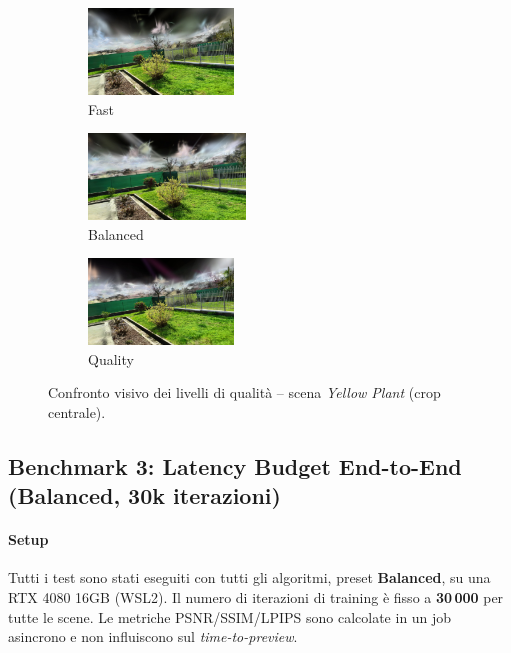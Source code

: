 \begin{figure}[H]
	\centering
	\begin{subfigure}{0.32\textwidth}
		\includegraphics[width=\linewidth, height=2.3cm, trim={80 40 80 40}, clip]{images/benchmarks/yellow_plant_taming_fast.jpg}
		\caption{Fast}
	\end{subfigure}
	\hfill
	\begin{subfigure}{0.32\textwidth}
		\includegraphics[width=\linewidth, height=2.3cm, trim={80 40 80 40}, clip]{images/benchmarks/yellow_plant_taming_balanced.jpg}
		\caption{Balanced}
	\end{subfigure}
	\hfill
	\begin{subfigure}{0.32\textwidth}
		\includegraphics[width=\linewidth, height=2.3cm, trim={80 40 80 40}, clip]{images/benchmarks/yellow_plant_taming_quality.jpg}
		\caption{Quality}
	\end{subfigure}
	\caption{Confronto visivo dei livelli di qualit\`a -- scena \textit{Yellow Plant} (crop centrale).}
	\label{fig:yellow_plant_quality_comparison}
\end{figure}


\subsection{Benchmark 3: Latency Budget End-to-End (Balanced, 30k iterazioni)}
\label{subsec:latency_budget_inria}

\paragraph{Setup}
Tutti i test sono stati eseguiti con tutti gli algoritmi, preset \textbf{Balanced}, su una RTX 4080 16GB (WSL2).  
Il numero di iterazioni di training è fisso a \textbf{30\,000} per tutte le scene.  
Le metriche PSNR/SSIM/LPIPS sono calcolate in un job asincrono e non influiscono sul \emph{time-to-preview}.

